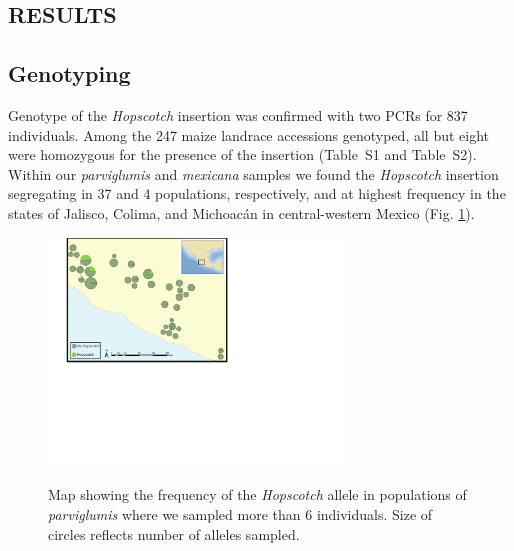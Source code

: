 \documentclass[11pt]{article}
\newcommand{\mbh}[1]{\textcolor{red}{ \emph{\scriptsize  #1}} }
\begin{document}
\begin{linenumbers}
\begin{flushleft}
\begin{centering}
\section*{RESULTS}
\end{centering}

\subsection*{Genotyping}

Genotype of the \emph{Hopscotch} insertion was confirmed with two PCRs for 837 individuals. Among the 247 maize landrace accessions genotyped, all but eight were homozygous for the presence of the insertion (Table~S1 and Table~S2). Within our \emph{parviglumis} and \emph{mexicana} samples we found the \emph{Hopscotch} insertion segregating in 37 and 4 populations, respectively, and at highest frequency in the states of Jalisco, Colima, and Michoac\'{a}n in central-western Mexico (Fig. \ref{Fig1Map}). 

\begin{figure}
  \centering \label{Fig1Map}
   \includegraphics[width=0.7\textwidth]{Fig1Map.pdf}
    \caption{Map showing the frequency of the \emph{Hopscotch} allele in populations of \emph{parviglumis} where we sampled more than 6 individuals. Size of circles reflects number of alleles sampled. } 
\end{figure}


\end{flushleft}
\end{linenumbers}
\end{document}
